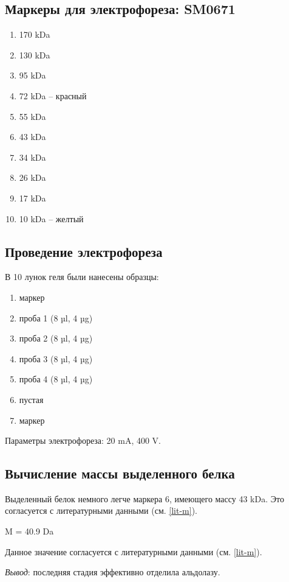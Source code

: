 
\subsection{Маркеры для электрофореза: SM0671}
\begin{enumerate}
\item 170 kDa
\item 130 kDa
\item 95 kDa
\item 72 kDa -- красный
\item 55 kDa
\item 43 kDa
\item 34 kDa
\item 26 kDa
\item 17 kDa
\item 10 kDa -- желтый
\end{enumerate}

\subsection{Проведение электрофореза}
В 10 лунок геля были нанесены образцы:
\begin{enumerate}
\item маркер
\item проба 1 (8 µl, 4 µg)
\item проба 2 (8 µl, 4 µg)
\item проба 3 (8 µl, 4 µg)
\item проба 4 (8 µl, 4 µg)
\item пустая
\item маркер
\end{enumerate}

Параметры электрофореза: 20 mA, 400 V.

\def\svgwidth{0.7\linewidth}

\subsection{Вычисление массы выделенного белка}
Выделенный белок немного легче маркера 6, имеющего массу 43 kDa.
Это согласуется с литературными данными (см. \ref{lit-m}).



M = 40.9 Da

Данное значение согласуется с литературными данными (см. \ref{lit-m}).

\emph{Вывод}: последняя стадия эффективно отделила альдолазу.

